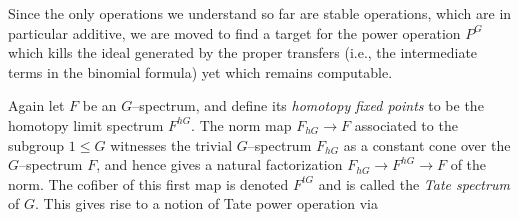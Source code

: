 Since the only operations we understand so far are stable operations, which are in particular additive, we are moved to find a target for the power operation \(P^G\) which kills the ideal generated by the proper transfers (i.e., the intermediate terms in the binomial formula) yet which remains computable.

\begin{definition}
Again let \(F\) be an \(G\)--spectrum, and define its \textit{homotopy fixed points} to be the homotopy limit spectrum \(F^{hG}\).  The norm map \(F_{hG} \to F\) associated to the subgroup \(1 \le G\) witnesses the trivial \(G\)--spectrum \(F_{hG}\) as a constant cone over the \(G\)--spectrum \(F\), and hence gives a natural factorization \(F_{hG} \to F^{hG} \to F\) of the norm.  The cofiber of this first map is denoted \(F^{tG}\) and is called the \textit{Tate spectrum} of \(G\).  This gives rise to a notion of Tate power operation via
\begin{center}
\end{center}
\end{definition}

